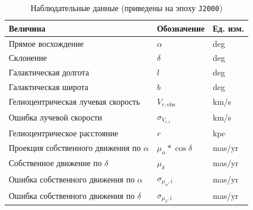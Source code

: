 \documentclass{matmex-diploma-custom}
\begin{document}
\begin{table}[h!]
\centering
\caption{Наблюдательные данные (приведены на эпоху \texttt{J2000})}
\begin{tabular}{|l|l|l|}
\hline
\textbf{Величина} & \textbf{Обозначение} & \textbf{Ед. изм.} \\
\hline
Прямое восхождение & $\alpha$ & deg \\
Склонение & $\delta$ & deg \\
Галактическая долгота & $l$ & deg \\
Галактическая широта & $b$ & deg \\
\hline
Гелиоцентрическая лучевая скорость & $V_{r, \mathrm{obs}}$ & km/s \\
Ошибка лучевой скорости & $\sigma_{V_{r, i}}$ & km/s \\
Гелиоцентрическое расстояние & $r$ & kpc \\
\hline
Проекция собственного движения по $\alpha$  & $\mu_{\alpha}* \cos{\delta}$ & mas/yr \\
Собственное движение по $\delta$  & $\mu_{\delta}$ & mas/yr \\
Ошибка собственного движения по $\alpha$  & $\sigma_{\mu_{\alpha}, i}$ & mas/yr \\
Ошибка собственного движения по $\delta$  & $\sigma_{\mu_{\delta}, i}$ & mas/yr \\
\hline
\end{tabular}
\end{table}
\end{document}
